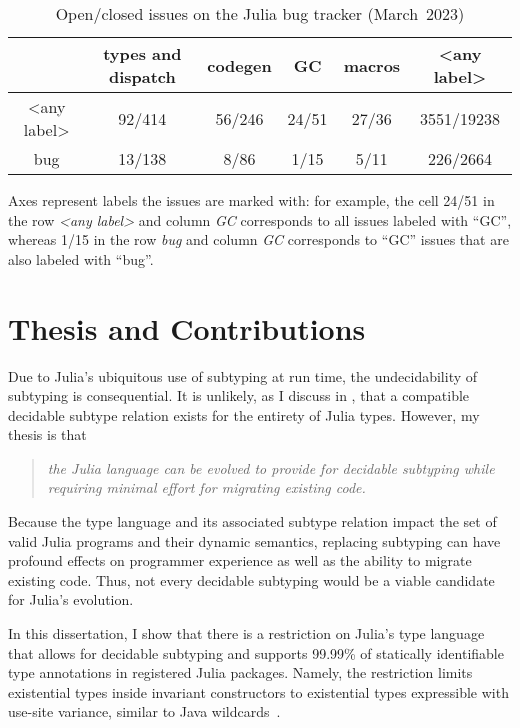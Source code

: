 \begin{table}[t]
\begin{threeparttable}
\centering\footnotesize
\caption{Open/closed issues on the Julia bug tracker
(March~2023)}\label{tab:julia-issues-stats}

\begin{tabular}{c|ccccc}
 & types and dispatch & codegen & GC & macros & <any label> \\
\midrule
<any label> &
  92/414 & 56/246 & 24/51 & 27/36 & 3551/19238 \\
bug &
  13/138 & 8/86 & 1/15 & 5/11 & 226/2664
\end{tabular}

\begin{tablenotes}[para]
\small
Axes represent labels the issues are marked with: for example, the cell
24/51 in the row \emph{<any label>} and column \emph{GC} corresponds to all
issues labeled with {``GC''}, whereas 1/15 in the row \emph{bug} and column 
\emph{GC} corresponds to {``GC''} issues that are also labeled with {``bug''}.
\end{tablenotes}
\end{threeparttable}
\end{table}

\section{Thesis and Contributions}

Due to Julia's ubiquitous use of subtyping at run time,
the undecidability of subtyping is consequential.
It is unlikely, as I discuss in ,
that a compatible decidable subtype relation exists for the entirety of Julia
types. However, my thesis is that
\begin{quotation}\emph{
  the Julia language can be evolved to provide for decidable subtyping while
  requiring minimal effort for migrating existing code.
}\end{quotation}

Because the type language and its associated subtype relation 
impact the set of valid Julia programs and their dynamic semantics,
replacing subtyping can have profound effects on programmer experience 
as well as the ability to migrate existing code.
Thus, not every decidable subtyping would be a viable candidate for
Julia's evolution.

In this dissertation, I show that there is
a restriction on Julia's type language that allows for decidable subtyping
and supports 99.99\% of statically identifiable type annotations
in registered Julia packages.
Namely, the restriction limits existential types inside invariant constructors
to existential types expressible with use-site variance,
similar to Java wildcards~\cite{bib:torgersen:wildcards:2004}.

